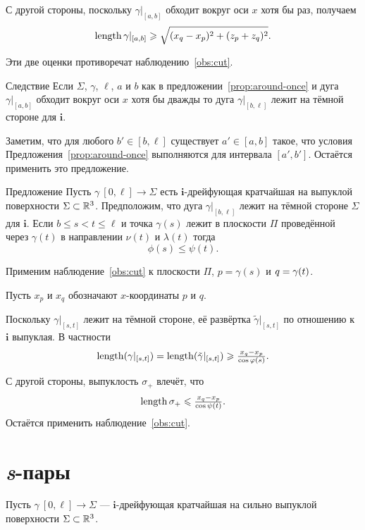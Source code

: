 \documentclass[a4paper,10pt]{article}
\begin{document}
С другой стороны, поскольку $\gamma|_{[a,b]}$ обходит вокруг оси $x$ хотя бы раз,
получаем 
\[\mathop{\rm length}\nolimits\gamma|_{[a,b]}\geqslant \sqrt{(x_q-x_p)^2+(z_p+z_q)^2}.\]

Эти две оценки противоречат наблюдению~\ref{obs:cut}.
\qeds

\begin{thm}{Следствие}\label{cor:around-twice}
Если $\Sigma$, $\gamma$, $\ell$, $a$ и $b$ как в предложении~\ref{prop:around-once} 
и дуга $\gamma|_{[a,b]}$ обходит вокруг оси $x$ хотя бы дважды
то дуга $\gamma|_{[b,\ell]}$ лежит на тёмной стороне для $\bm{i}$.
\end{thm}

Заметим, что для любого $b'\in [b,\ell]$
существует $a'\in [a,b]$ 
такое, что условия Предложения~\ref{prop:around-once} выполняются для интервала $[a',b']$. 
Остаётся применить это предложение.
\qeds 


\begin{thm}{Предложение}\label{prop:phi-psi}
Пусть $\gamma\:[0,\ell]\to \Sigma$ есть $\bm{i}$-дрейфующая кратчайшая на выпуклой поверхности $\Sigma\subset \mathbb{R}^3$.
Предположим, что дуга $\gamma|_{[b,\ell]}$ 
лежит на тёмной стороне $\Sigma$ для $\bm{i}$.
Если $b\le s<t\le \ell$ и точка $\gamma(s)$ лежит в плоскости $\Pi$ проведённой через $\gamma(t)$ в направлении $\nu(t)$ и $\lambda(t)$
тогда
\[\phi(s)\le \psi(t).\]
\end{thm}

Применим наблюдение~\ref{obs:cut} к плоскости $\Pi$, $p=\gamma(s)$ и $q\zz=\gamma(t)$.

Пусть $x_p$ и $x_q$ обозначают $x$-координаты $p$ и $q$.

Поскольку $\gamma|_{[s,t]}$ лежит на тёмной стороне,
её развёртка $\tilde\gamma|_{[s,t]}$ 
по отношению к $\bm{i}$ выпуклая.
В частности
\[\mathop{\rm length}\nolimits(\gamma|_{[s,t]})
=
\mathop{\rm length}\nolimits(\tilde\gamma|_{[s,t]})
\geqslant
\tfrac{x_q-x_p}{\cos\varphi(s)}.\]

С другой стороны, выпуклость $\sigma_+$ влечёт, что
\[\mathop{\rm length}\nolimits\sigma_+\leqslant \tfrac{x_q-x_p}{\cos\psi(t)}.\]
Остаётся применить наблюдение~\ref{obs:cut}.
\qeds

\section{\textit{s}-пары}

Пусть  $\gamma\:[0,\ell]\to\Sigma$ --- $\bm{i}$-дрейфующая кратчайшая
на сильно выпуклой поверхности $\Sigma\subset \mathbb{R}^3$.
\end{document}
